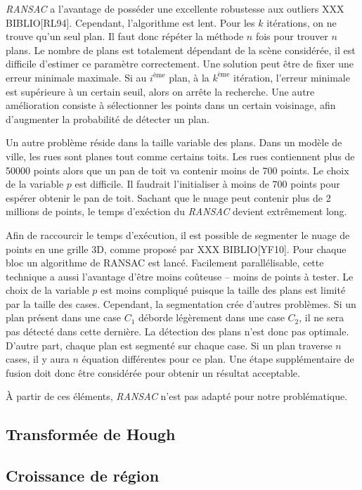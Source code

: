 \documentclass[12pt, twoside]{article}
\begin{document}
\textit{RANSAC} a l’avantage de posséder une excellente robustesse aux outliers XXX BIBLIO[RL94]. Cependant, l’algorithme est lent. Pour les $k$ itérations, on ne trouve qu’un seul plan. Il faut donc répéter la méthode $n$ fois pour trouver $n$ plans. Le nombre de plans est totalement dépendant de la scène considérée, il est difficile d’estimer ce paramètre correctement. Une solution peut être de fixer une erreur minimale maximale. Si au $i^\text{ème}$ plan, à la $k^\text{ème}$ itération, l’erreur minimale est supérieure à un certain seuil, alors on arrête la recherche. Une autre amélioration consiste à sélectionner les points dans un certain voisinage, afin d’augmenter la probabilité de détecter un plan.

Un autre problème réside dans la taille variable des plans. Dans un modèle de ville, les rues sont planes tout comme certains toits. Les rues contiennent plus de 50000 points alors que un pan de toit va contenir moins de 700 points. Le choix de la variable $p$ est difficile. Il faudrait l'initialiser à moins de 700 points pour espérer obtenir le pan de toit. Sachant que le nuage peut contenir plus de 2 millions de points, le temps d'exéction du \textit{RANSAC} devient extrêmement long.

Afin de raccourcir le temps d'exécution, il est possible de segmenter le nuage de points en une grille 3D, comme proposé par XXX BIBLIO[YF10]. Pour chaque bloc un algorithme de RANSAC est lancé. Facilement parallélisable, cette technique a aussi l'avantage d'être moins coûteuse -- moins de points à tester. Le choix de la variable $p$ est moins compliqué puisque la taille des plans est limité par la taille des cases. Cependant, la segmentation crée d'autres problèmes. Si un plan présent dans une case $C_1$ déborde légèrement dans une case $C_2$, il ne sera pas détecté dans cette dernière. La détection des plans n'est donc pas optimale. D'autre part, chaque plan est segmenté sur chaque case. Si un plan traverse $n$ cases, il y aura $n$ équation différentes pour ce plan. Une étape supplémentaire de fusion doit donc être considérée pour obtenir un résultat acceptable.

À partir de ces éléments, \textit{RANSAC} n'est pas adapté pour notre problématique.

\subsection{Transformée de Hough}

\subsection{Croissance de région}
\end{document}
